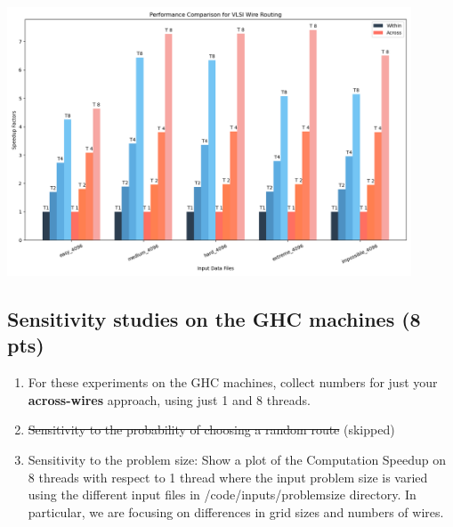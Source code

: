 \documentclass[letterpaper,11pt]{exam}
\begin{document}
\begin{questions}
\begin{enumerate}[label=\roman*.]
              \includegraphics*[width=0.9\textwidth]{./img/speedup_comparison.png}
    \end{enumerate}

    \newpage
    \question
    \subsection*{Sensitivity studies on the GHC machines (8 pts)}
    \begin{enumerate}[label=\roman*.]
        \item For these experiments on the GHC machines,
              collect numbers for just your \textbf{across-wires} approach, using just 1 and 8 threads.

        \item \sout{Sensitivity to the probability of choosing a random route} (skipped)
        \item Sensitivity to the problem size: Show a plot of the Computation Speedup on 8 threads with
              respect to 1 thread where the input problem size is varied using the different input files in
              /code/inputs/problemsize directory. In particular, we are focusing on differences in
              grid sizes and numbers of wires. %


\end{enumerate}
\end{questions}
\end{document}
